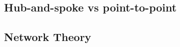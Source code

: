 \label{sec:theory}

\subsection{Hub-and-spoke vs point-to-point}


\subsection{Network Theory}
\label{subsec:Network Theory}




